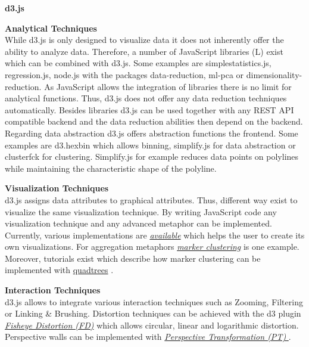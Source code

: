 \par
\noindent \textbf{d3.js}
\par
\textbf{Analytical Techniques}\\
While d3.js is only designed to visualize data it does not inherently offer the ability to analyze data. Therefore, a number of JavaScript libraries  (L) exist which can be combined with d3.js. Some examples are simplestatistics.js, regression.js, node.js with the packages data-reduction, ml-pca or dimensionality-reduction. As JavaScript allows the integration of libraries there is no limit for analytical functions. Thus, d3.js does not offer any data reduction techniques automatically. Besides libraries d3.js can be used together with any REST API compatible backend and the data reduction abilities then depend on the backend.
Regarding data abstraction d3.js offers abstraction functions the frontend. Some examples are d3.hexbin which allows binning, simplify.js for data abstraction or clusterfck for clustering. Simplify.js for example reduces data points on polylines while maintaining the characteristic shape of the polyline. 
\par

\textbf{Visualization Techniques}\\
d3.js assigns data attributes to graphical attributes. Thus, different way exist to visualize the same visualization technique. By writing JavaScript code any visualization technique and any advanced metaphor can be implemented. Currently, various implementations are \href{https://github.com/d3/d3/wiki/Gallery}{\textit{available}} which helps the user to create its own visualizations. For aggregation metaphors \href{http://bl.ocks.org/gisminister/10001728}{\textit{marker clustering}} is one example. Moreover, tutorials exist which describe how marker clustering can be implemented with  \href{https://www.phase2technology.com/blog/using-d3-quadtrees-to-power-an-interactive-map-for-bonnier-corporation/}{quadtrees}  \cite{Morrison2014}.
\par

\textbf{Interaction Techniques}\\
d3.js allows to integrate various interaction techniques such as Zooming, Filtering or Linking \& Brushing. Distortion techniques can be achieved with the d3 plugin \hyperlink{https://bost.ocks.org/mike/fisheye/}{\textit{Fisheye Distortion  (FD)}}  \cite{Bostock2012} which allows circular, linear and logarithmic distortion.
Perspective walls can be implemented with \hyperlink{https://bl.ocks.org/mbostock/10571478}{\textit{Perspective Transformation  (PT) }}  \cite{Bostock2017}.\\

